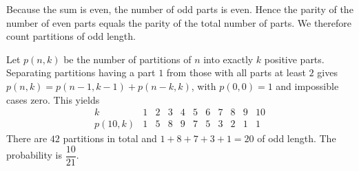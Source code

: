 Because the sum is even, the number of odd parts is even. Hence the parity of the number of even parts equals the parity of the total number of parts. We therefore count partitions of odd length.

Let $p(n,k)$ be the number of partitions of $n$ into exactly $k$ positive parts. Separating partitions having a part $1$ from those with all parts at least $2$ gives
$p(n,k)=p(n-1,k-1)+p(n-k,k)$, with $p(0,0)=1$ and impossible cases zero. This yields
\[
\begin{array}{c|rrrrrrrrrr}
k&1&2&3&4&5&6&7&8&9&10\\\hline
p(10,k)&1&5&8&9&7&5&3&2&1&1
\end{array}
\]
There are $42$ partitions in total and $1+8+7+3+1=20$ of odd length. The probability is $\boxed{\dfrac{10}{21}}$.
